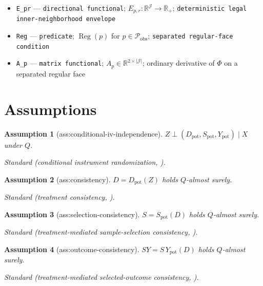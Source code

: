\documentclass{article}
\newtheorem{assumption}{Assumption}
\begin{document}
\begin{itemize}
  \item \texttt{E\_\allowbreak{}pr} --- \texttt{directional functional}; \(E_{p,r}:\mathbb R^{\mathcal J}\to\mathbb R_+\); \texttt{deterministic legal inner-\allowbreak{}neighborhood envelope}
  \item \texttt{Reg} --- \texttt{predicate}; \(\operatorname{Reg}(p)\) for \(p\in\mathcal P_{\mathrm{obs}}\); \texttt{separated regular-\allowbreak{}face condition}
  \item \texttt{A\_\allowbreak{}p} --- \texttt{matrix functional}; \(A_p\in\mathbb R^{2\times|\mathcal J|}\); ordinary derivative of \(\Phi\) on a separated regular face
\end{itemize}

\section{Assumptions}

\begin{assumption}[ass:conditional-iv-independence]\label{ass:conditional-iv-independence}
\(Z\perp(D_{\mathrm{pot}},S_{\mathrm{pot}},Y_{\mathrm{pot}})\mid X\) under \(Q\).
\par\smallskip\noindent\emph{Standard} (conditional instrument randomization, \cite{AngristImbensRubin1996}).
\end{assumption}

\begin{assumption}[ass:consistency]\label{ass:consistency}
\(D=D_{\mathrm{pot}}(Z)\) holds \(Q\)-almost surely.
\par\smallskip\noindent\emph{Standard} (treatment consistency, \cite{AngristImbensRubin1996}).
\end{assumption}

\begin{assumption}[ass:selection-consistency]\label{ass:selection-consistency}
\(S=S_{\mathrm{pot}}(D)\) holds \(Q\)-almost surely.
\par\smallskip\noindent\emph{Standard} (treatment-mediated sample-selection consistency, \cite{DongHeiler2026}).
\end{assumption}

\begin{assumption}[ass:outcome-consistency]\label{ass:outcome-consistency}
\(SY=S\,Y_{\mathrm{pot}}(D)\) holds \(Q\)-almost surely.
\par\smallskip\noindent\emph{Standard} (treatment-mediated selected-outcome consistency, \cite{DongHeiler2026}).
\end{assumption}
\end{document}
